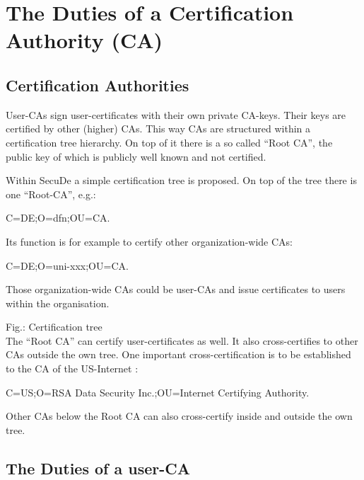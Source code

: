 \section{The Duties of a Certification Authority (CA)}
\thispagestyle{myheadings}
\label{ca}

\subsection{Certification Authorities}
\label{ca-dfn}

User-CAs sign user-certificates with their own private CA-keys.
Their keys are certified by other (higher) CAs.
This way CAs are structured within a certification tree hierarchy.
On top of it there is a so called ``Root CA'', the public key of which
is publicly well known and not certified.

Within SecuDe
a simple certification tree is proposed.
On top of the tree there is one ``Root-CA'', e.g.:
\begin{center}
C=DE;O=dfn;OU=CA.
\end{center}
Its function is for example to certify other organization-wide CAs:
\begin{center}
C=DE;O=uni-xxx;OU=CA.
\end{center}
Those organization-wide CAs could be user-CAs and issue certificates
to users within the organisation.

\begin{center}
\end{center}
\label{fig-ca-dfn}
{\footnotesize Fig.: Certification tree}
\\ [1em]

The ``Root CA'' can certify user-certificates as well.
It also cross-certifies to other CAs outside the own tree.
One important cross-certification is to be established to the CA of the
US-Internet
\cite{rfc1}:
\begin{center}
C=US;O=RSA Data Security Inc.;OU=Internet Certifying Authority.
\end{center}
Other CAs below the Root CA can also cross-certify
inside and outside the own tree.

\subsection{The Duties of a user-CA}
\label{ca-uca}

